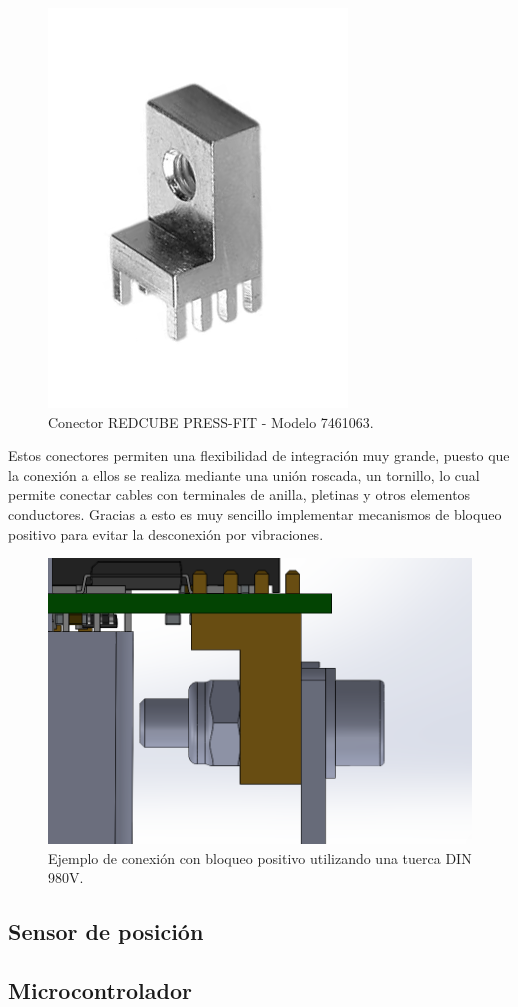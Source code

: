 \begin{figure}[H]
	\centering
	\includegraphics[width=0.35\linewidth]{fig/pressfit}
	\caption{Conector REDCUBE PRESS-FIT - Modelo 7461063.}
\end{figure}

Estos conectores permiten una flexibilidad de integración muy grande, puesto que la conexión a ellos se realiza mediante una unión roscada, un tornillo, lo cual permite conectar cables con terminales de anilla, pletinas y otros elementos conductores. Gracias a esto es muy sencillo implementar mecanismos de bloqueo positivo para evitar la desconexión por vibraciones.

\begin{figure}[H]
	\centering
	\includegraphics[width=0.5\linewidth]{fig/pressfit-980v}
	\caption{Ejemplo de conexión con bloqueo positivo utilizando una tuerca DIN 980V.}
\end{figure}



\subsection{Sensor de posición}



\subsection{Microcontrolador}

